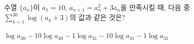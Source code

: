 수열 $\{a_n\}$이 $a_1=10$, $a_{n+1}=a_n^{2}+3a_n$을 만족시킬 때, 다음 중 $\displaystyle\sum_{k=1}^{30}\log(a_k+3)$의 값과 같은 것은?
\begin{choices32}{$\log a_{30}-10$}{$\log a_{30}-1$}{$\log a_{31}-10$}{$\log a_{31}-1$}{$\log a_{31}$}\end{choices32}
